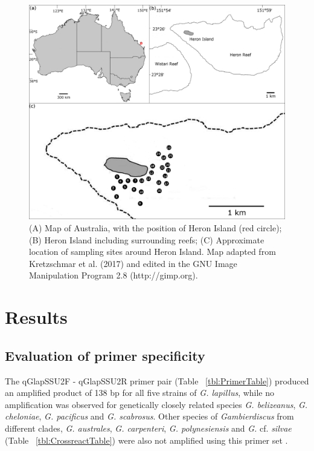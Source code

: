 \documentclass[12pt]{article}
\begin{document}
\begin{figure} 
\includegraphics[scale=1.7]{Hero_qpcr-figs/Fig2.png} 
\caption{(A) Map of Australia, with the position of Heron Island (red circle); (B) Heron Island including surrounding reefs; (C) Approximate location of sampling sites around Heron Island. Map adapted from Kretzschmar et al. (2017)  \citep{kretzschmar2017characterization} and edited in the GNU Image Manipulation Program 2.8 (http://gimp.org).} 
\label{fig:samplesites}
\end{figure} 


\newpage
\section*{Results}
\subsection*{Evaluation of primer specificity}
\FloatBarrier
The qGlapSSU2F - qGlapSSU2R primer pair (Table ~\ref{tbl:PrimerTable}) produced an amplified product of 138 bp for all five strains of \emph{G. lapillus}, while no amplification was observed for genetically closely related species \emph{G. belizeanus}, \emph{G. cheloniae}, \emph{G. pacificus} and \emph{G. scabrosus}. 
Other species of \emph{Gambierdiscus} from different clades, \emph{G. australes}, \emph{G. carpenteri}, \emph{G. polynesiensis} and \emph{G.} cf. \emph{silvae} (Table ~\ref{tbl:CrossreactTable}) were also not amplified using this primer set \citep{smith2016new,kretzschmar2017characterization}.
\end{document}
